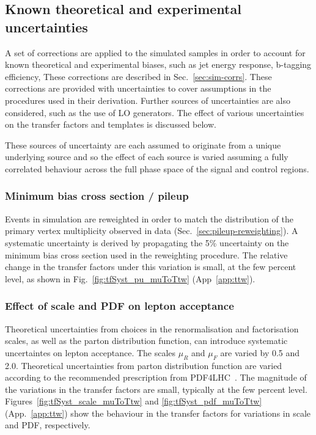 \subsection{Known theoretical and experimental uncertainties}
\label{sec:mc-variations}

A set of corrections are applied to the simulated samples in order to
account for known theoretical and experimental biases, such as jet
energy response, b-tagging efficiency, \etc These corrections are
described in Sec.~\ref{sec:sim-corrs}. These corrections are provided
with uncertainties to cover assumptions in the procedures used in
their derivation. Further sources of uncertainties are also
considered, such as the use of LO generators. The effect of various
uncertainties on the transfer factors and \HTmiss templates is
discussed below.

These sources of uncertainty are each assumed to originate from a
unique underlying source and so the effect of each source is varied
assuming a fully correlated behaviour across the full phase space of
the signal and control regions.

\subsubsection{Minimum bias cross section / pileup}
\label{sec:tfSyst_pu}

Events in simulation are reweighted in order to match the distribution
of the primary vertex multiplicity observed in data
(Sec.~\ref{sec:pileup-reweighting}).  A systematic uncertainty is
derived by propagating the 5\% uncertainty on the minimum bias cross
section used in the reweighting procedure.  The relative change in the
transfer factors under this variation is small, at the few percent
level, as shown in Fig.~\ref{fig:tfSyst_pu_muToTtw}
(App~\ref{app:ttw}).

\subsubsection{Effect of scale and PDF on lepton acceptance}
\label{sec:tfSyst_pdf}

Theoretical uncertainties from choices in the renormalisation and
factorisation scales, as well as the parton distribution function, can
introduce systematic uncertaintes on lepton acceptance. The scales
$\mu_R$ and $\mu_F$ are varied by 0.5 and 2.0. Theoretical
uncertainties from parton distribution function are varied according
to the recommended prescription from PDF4LHC~\cite{PDF4LHC:2015}. The
magnitude of the variations in the transfer factors are small,
typically at the few percent
level. Figures~\ref{fig:tfSyst_scale_muToTtw} and
\ref{fig:tfSyst_pdf_muToTtw} (App.~\ref{app:ttw}) show the behaviour
in the transfer factors for variations in scale and PDF, respectively.

